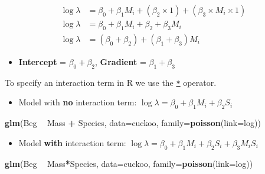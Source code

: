 \documentclass[]{book}
\newenvironment{Shaded}{\begin{snugshade}}{\end{snugshade}}
\newcommand{\KeywordTok}[1]{\textcolor[rgb]{0.13,0.29,0.53}{\textbf{#1}}}
\newcommand{\DataTypeTok}[1]{\textcolor[rgb]{0.13,0.29,0.53}{#1}}
\newcommand{\StringTok}[1]{\textcolor[rgb]{0.31,0.60,0.02}{#1}}
\newcommand{\OperatorTok}[1]{\textcolor[rgb]{0.81,0.36,0.00}{\textbf{#1}}}
\newcommand{\NormalTok}[1]{#1}
\providecommand{\tightlist}{%
  \setlength{\itemsep}{0pt}\setlength{\parskip}{0pt}}
\theoremstyle{definition}
\theoremstyle{definition}
\theoremstyle{definition}
\theoremstyle{remark}
\begin{document}
\[
\begin{aligned}
    \log{\lambda} & = \beta_0 + \beta_1 M_i + (\beta_2 \times 1)  + (\beta_3 \times M_i \times 1)\\
    \log{\lambda} & = \beta_0 + \beta_1 M_i + \beta_2 + \beta_3M_i\\
    \log{\lambda} & = (\beta_0+\beta_2) + (\beta_1+\beta_3) M_i
\end{aligned}
\]

\begin{itemize}
\tightlist
\item
  \textbf{Intercept} = \(\beta_0 + \beta_2\), \textbf{Gradient} =
  \(\beta_1 + \beta_3\)
\end{itemize}

To specify an interaction term in R we use the
\href{https://www.rdocumentation.org/packages/stats/versions/3.5.1/topics/formula}{\texttt{*}}
operator.

\begin{itemize}
\tightlist
\item
  Model with \textbf{no} interaction term:
  \(\log{\lambda} = \beta_0 + \beta_1 M_i + \beta_2 S_i\)
\end{itemize}

\begin{Shaded}
\begin{Highlighting}[]
\KeywordTok{glm}\NormalTok{(Beg }\OperatorTok{~}\StringTok{ }\NormalTok{Mass }\OperatorTok{+}\StringTok{ }\NormalTok{Species, }\DataTypeTok{data=}\NormalTok{cuckoo, }\DataTypeTok{family=}\KeywordTok{poisson}\NormalTok{(}\DataTypeTok{link=}\NormalTok{log))}
\end{Highlighting}
\end{Shaded}

\begin{itemize}
\tightlist
\item
  Model \textbf{with} interaction term:
  \(\log{\lambda} = \beta_0 + \beta_1 M_i + \beta_2 S_i + \beta_3 M_i S_i\)
\end{itemize}

\begin{Shaded}
\begin{Highlighting}[]
\KeywordTok{glm}\NormalTok{(Beg }\OperatorTok{~}\StringTok{ }\NormalTok{Mass}\OperatorTok{*}\NormalTok{Species, }\DataTypeTok{data=}\NormalTok{cuckoo, }\DataTypeTok{family=}\KeywordTok{poisson}\NormalTok{(}\DataTypeTok{link=}\NormalTok{log))}
\end{Highlighting}
\end{Shaded}
\end{document}
